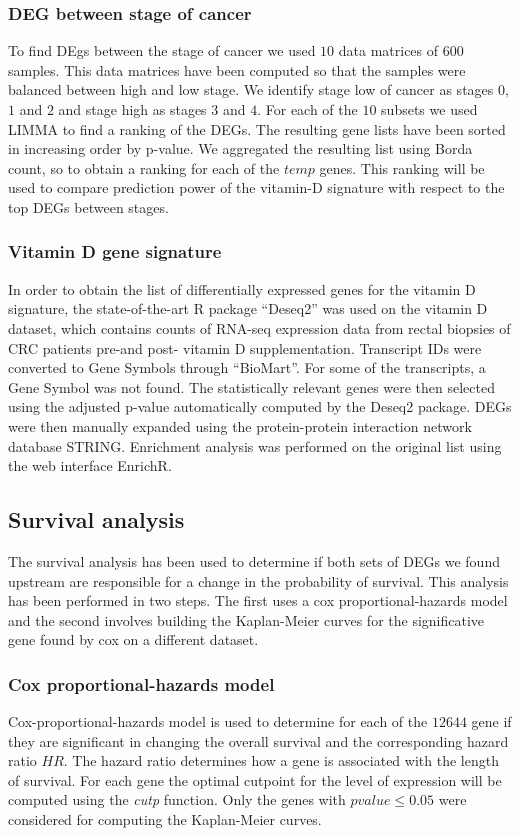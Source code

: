 \documentclass[fleqn,10pt]{SelfArx} %
\begin{document}
		\subsubsection{DEG between stage of cancer}
		To find DEgs between the stage of cancer we used $10$ data matrices of $600$ samples.
		This data matrices have been computed so that the samples were balanced between high and low stage.
		We identify stage low of cancer as stages $0$, $1$ and $2$ and stage high as stages $3$ and $4$.
		For each of the $10$ subsets we used LIMMA to find a ranking of the DEGs.
		The resulting gene lists have been sorted in increasing order by p-value.
		We aggregated the resulting list using Borda count, so to obtain a ranking for each of the $temp$ genes.
		This ranking will be used to compare prediction power of the vitamin-D signature with respect to the top DEGs between stages.

		\subsubsection{Vitamin D gene signature}
		In order to obtain the list of differentially expressed genes for the vitamin D signature, the state-of-the-art R package “Deseq2” was used on the vitamin D dataset, which contains counts of RNA-seq expression data from rectal biopsies of CRC patients pre-and post- vitamin D supplementation. Transcript IDs were converted to Gene Symbols through “BioMart”. For some of the transcripts, a Gene Symbol was not found. The statistically relevant genes were then selected using the adjusted p-value automatically computed by the Deseq2 package. DEGs were then manually expanded using the protein-protein interaction network database STRING.
Enrichment analysis was performed on the original list using the web interface EnrichR.


	\subsection{Survival analysis}
	The survival analysis has been used to determine if both sets of DEGs we found upstream are responsible for a change in the probability of survival.
	This analysis has been performed in two steps.
	The first uses a cox proportional-hazards model and the second involves building the Kaplan-Meier curves for the significative gene found by cox on a different dataset.

		\subsubsection{Cox proportional-hazards model}
		Cox-proportional-hazards model is used to determine for each of the $12644$ gene if they are significant in changing the overall survival and the corresponding hazard ratio $HR$.
		The hazard ratio determines how a gene is associated with the length of survival.
		For each gene the optimal cutpoint for the level of expression will be computed using the \emph{cutp} function.
		Only the genes with $pvalue \le 0.05$ were considered for computing the Kaplan-Meier curves.
\end{document}
